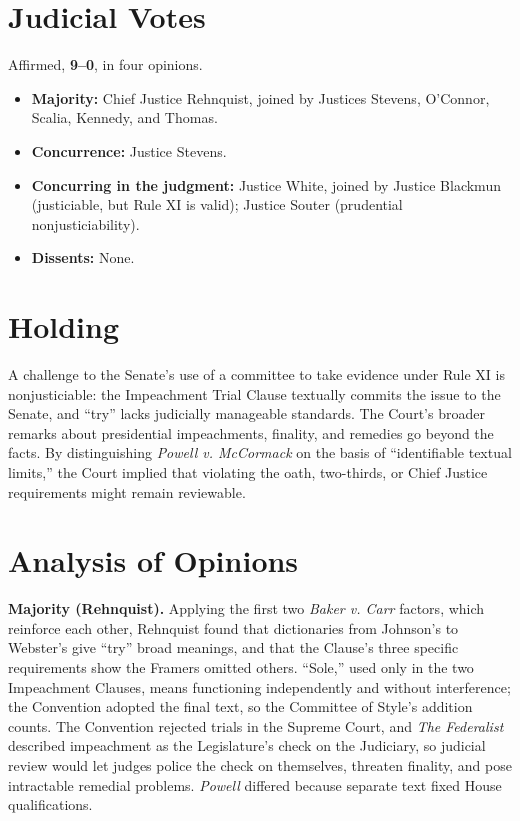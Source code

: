 \documentclass[12pt]{article}
\begin{document}
\section{Judicial Votes}

Affirmed, \textbf{9--0}, in four opinions.
\begin{itemize}
\item \textbf{Majority:} Chief Justice Rehnquist, joined by Justices Stevens, O'Connor, Scalia, Kennedy, and Thomas.
\item \textbf{Concurrence:} Justice Stevens.
\item \textbf{Concurring in the judgment:} Justice White, joined by Justice Blackmun (justiciable, but Rule XI is valid); Justice Souter (prudential nonjusticiability).
\item \textbf{Dissents:} None.
\end{itemize}

\section{Holding}

A challenge to the Senate's use of a committee to take evidence under Rule XI is nonjusticiable: the Impeachment Trial Clause textually commits the issue to the Senate, and ``try'' lacks judicially manageable standards. The Court's broader remarks about presidential impeachments, finality, and remedies go beyond the facts. By distinguishing \textit{Powell v. McCormack} on the basis of ``identifiable textual limits,'' the Court implied that violating the oath, two-thirds, or Chief Justice requirements might remain reviewable.

\section{Analysis of Opinions}

\textbf{Majority (Rehnquist).} Applying the first two \textit{Baker v. Carr} factors, which reinforce each other, Rehnquist found that dictionaries from Johnson's to Webster's give ``try'' broad meanings, and that the Clause's three specific requirements show the Framers omitted others. ``Sole,'' used only in the two Impeachment Clauses, means functioning independently and without interference; the Convention adopted the final text, so the Committee of Style's addition counts. The Convention rejected trials in the Supreme Court, and \textit{The Federalist} described impeachment as the Legislature's check on the Judiciary, so judicial review would let judges police the check on themselves, threaten finality, and pose intractable remedial problems. \textit{Powell} differed because separate text fixed House qualifications.
\end{document}
